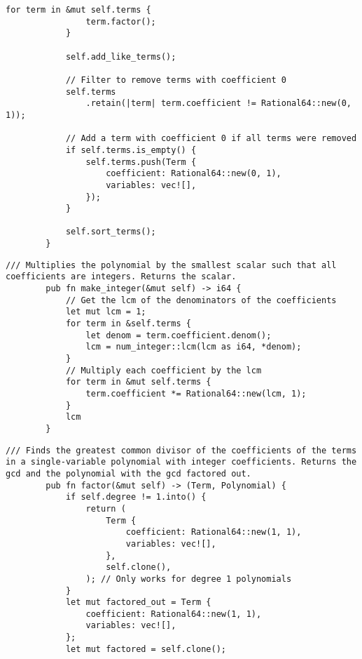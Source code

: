 {\begin{lstlisting}[caption={The implementation of the \texttt{simplify()} method for the \texttt{Polynomial} struct}, label={lst:polynomial-simplify}]
            for term in &mut self.terms {
                term.factor();
            }

            self.add_like_terms();

            // Filter to remove terms with coefficient 0
            self.terms
                .retain(|term| term.coefficient != Rational64::new(0, 1));

            // Add a term with coefficient 0 if all terms were removed
            if self.terms.is_empty() {
                self.terms.push(Term {
                    coefficient: Rational64::new(0, 1),
                    variables: vec![],
                });
            }

            self.sort_terms();
        }
    \end{lstlisting}

    \begin{lstlisting}[caption={The implementation of the \texttt{make\_integer()} method for the \texttt{Polynomial} struct}, label={lst:polynomial-make-integer}]
        /// Multiplies the polynomial by the smallest scalar such that all coefficients are integers. Returns the scalar.
        pub fn make_integer(&mut self) -> i64 {
            // Get the lcm of the denominators of the coefficients
            let mut lcm = 1;
            for term in &self.terms {
                let denom = term.coefficient.denom();
                lcm = num_integer::lcm(lcm as i64, *denom);
            }
            // Multiply each coefficient by the lcm
            for term in &mut self.terms {
                term.coefficient *= Rational64::new(lcm, 1);
            }
            lcm
        }
    \end{lstlisting}

    \begin{lstlisting}[caption={The implementation of the \texttt{factor()} method for the \texttt{Polynomial} struct}, label={lst:polynomial-factor}]
        /// Finds the greatest common divisor of the coefficients of the terms in a single-variable polynomial with integer coefficients. Returns the gcd and the polynomial with the gcd factored out.
        pub fn factor(&mut self) -> (Term, Polynomial) {
            if self.degree != 1.into() {
                return (
                    Term {
                        coefficient: Rational64::new(1, 1),
                        variables: vec![],
                    },
                    self.clone(),
                ); // Only works for degree 1 polynomials
            }
            let mut factored_out = Term {
                coefficient: Rational64::new(1, 1),
                variables: vec![],
            };
            let mut factored = self.clone();


\end{lstlisting}}
